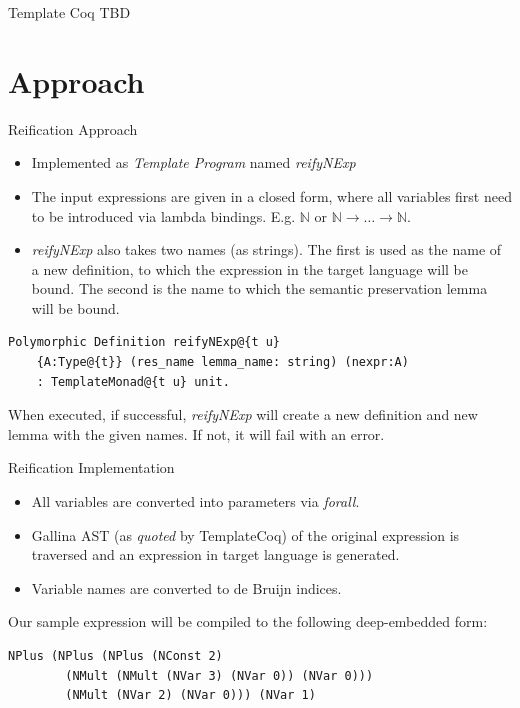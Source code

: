 \documentclass[aspectratio=169]{beamer}
\newcommand{\N}{\mathbb{N}}
\begin{document}
\begin{frame}{Template Coq}
  TBD
\end{frame}

\section{Approach}

\begin{frame}[fragile]{Reification Approach}
  
  \begin{itemize}
  \item Implemented as \textit{Template Program} named \emph{reifyNExp}
  \item The input expressions are given in a closed form, where all
    variables first need to be introduced via lambda
    bindings. E.g. $\mathbb{N}$ or
    $\N \rightarrow \ldots \rightarrow \N$.
  \item \emph{reifyNExp} also takes two names (as strings). The first
    is used as the name of a new definition, to which the expression
    in the target language will be bound. The second is the name to
    which the semantic preservation lemma will be bound.
  \end{itemize}

  \begin{lstlisting}[language=Coq, mathescape=true, frame=single]
  Polymorphic Definition reifyNExp@{t u}
    {A:Type@{t}} (res_name lemma_name: string) (nexpr:A)
    : TemplateMonad@{t u} unit.
  \end{lstlisting}

  When executed, if successful, \emph{reifyNExp} will create a new
  definition and new lemma with the given names. If not, it will fail
  with an error. 

\end{frame}


\begin{frame}[fragile]{Reification Implementation}
  
  \begin{itemize}
  \item All variables are converted into parameters via \emph{forall}.
  \item Gallina AST (as \textit{quoted} by TemplateCoq) of the
    original expression is traversed and an expression in target
    language is generated.
  \item Variable names are converted to de Bruijn indices.
  \end{itemize}
  \medskip
  Our sample expression will be compiled to the following
  deep-embedded form:
  
    \begin{lstlisting}[language=Coq, mathescape=true,frame=single]
    NPlus (NPlus (NPlus (NConst 2)
        (NMult (NMult (NVar 3) (NVar 0)) (NVar 0)))
        (NMult (NVar 2) (NVar 0))) (NVar 1)
  \end{lstlisting}

\end{frame}
\end{document}
